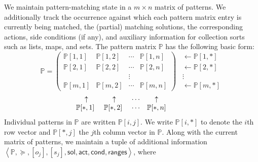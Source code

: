 \documentclass{article}
\theoremstyle{definition}
\newcommand{\pr}[1]{\left\langle #1 \right\rangle}
\newcommand{\sol}{\mathsf{sol}}
\newcommand{\actb}{\mathsf{act}}
\newcommand{\condb}{\mathsf{cond}}
\newcommand{\lslen}{\mathsf{ranges}}
\newcommand{\PP}{\mathbb{P}}
\newcommand{\pp}[2]{\PP[#1,#2]}
\newcommand{\pprow}[1]{\PP[#1,*]}
\newcommand{\ppcol}[1]{\PP[*,#1]}
\begin{document}
We maintain pattern-matching state in a $ m \times n $ matrix of patterns. We
additionally track the occurrence against which each pattern matrix entry is
currently being matched, the (partial) matching solutions, the corresponding
actions, side conditions (if any), and auxiliary information for collection
sorts such as lists, maps, and sets. The pattern matrix $ \PP $ has the
following basic form:
$$
\PP =
\begin{pmatrix}
\PP[1,1] & \PP[1,2] & \cdots & \PP[1,n]  \\
\PP[2,1] & \PP[2,2] & \cdots & \PP[2,n]  \\
         &          & \vdots \\
\PP[m,1] & \PP[m,2] & \cdots & \PP[m,n] 
\end{pmatrix}
\ \ 
\begin{matrix}
\leftarrow \pprow{1} \\
\leftarrow \pprow{2} \\
\vdots \\
\leftarrow \pprow{m}
\end{matrix}
$$
\vspace{-0.5\baselineskip}
$$
\begin{matrix}
\uparrow & \uparrow & \cdots & \uparrow \\
\ppcol{1}\ & \ppcol{2}\ & \cdots & \ppcol{n}
\end{matrix}
\kern7ex
$$
Individual patterns in $\PP$ are written $\pp{i}{j}$. We write $\pprow{i}$ to
denote the $i$th row vector and $\ppcol{j}$ the $j$th column vector in $\PP$.
Along with the current matrix of patterns, we maintain a tuple of additional
information $ \pr{\PP, \succeq, [o_j], [s_j], \sol, \actb, \condb, \lslen}$, where
\end{document}
